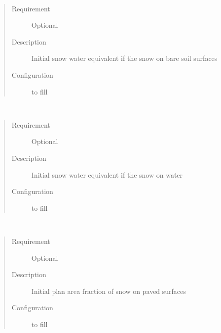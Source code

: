 \documentclass[letterpaper,10pt,english]{sphinxmanual}
\begin{document}
\begin{fulllineitems}
\label{\detokenize{input_files/Initial_Conditions/Snow_related_parameters:cmdoption-arg-snowpackbsoil}}~\begin{quote}\begin{description}
\item[{Requirement}] \leavevmode
Optional

\item[{Description}] \leavevmode
Initial snow water equivalent if the snow on bare soil surfaces

\item[{Configuration}] \leavevmode
to fill

\end{description}\end{quote}

\end{fulllineitems}


\begin{fulllineitems}
\label{\detokenize{input_files/Initial_Conditions/Snow_related_parameters:cmdoption-arg-snowpackwater}}~\begin{quote}\begin{description}
\item[{Requirement}] \leavevmode
Optional

\item[{Description}] \leavevmode
Initial snow water equivalent if the snow on water

\item[{Configuration}] \leavevmode
to fill

\end{description}\end{quote}

\end{fulllineitems}


\begin{fulllineitems}
\label{\detokenize{input_files/Initial_Conditions/Snow_related_parameters:cmdoption-arg-snowfracpaved}}~\begin{quote}\begin{description}
\item[{Requirement}] \leavevmode
Optional

\item[{Description}] \leavevmode
Initial plan area fraction of snow on paved surfaces

\item[{Configuration}] \leavevmode
to fill

\end{description}\end{quote}

\end{fulllineitems}
\end{document}
